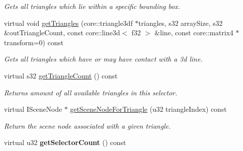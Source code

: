 \begin{DoxyCompactItemize}
\begin{DoxyCompactList}\small\item\em Gets all triangles which lie within a specific bounding box. \end{DoxyCompactList}\item 
\hypertarget{classirr_1_1scene_1_1_c_terrain_triangle_selector_ab5a72897c8f1dc5cc2e7c6ace368c8ed}{virtual void \hyperlink{classirr_1_1scene_1_1_c_terrain_triangle_selector_ab5a72897c8f1dc5cc2e7c6ace368c8ed}{get\-Triangles} (core\-::triangle3df $\ast$triangles, s32 array\-Size, s32 \&out\-Triangle\-Count, const core\-::line3d$<$ f32 $>$ \&line, const core\-::matrix4 $\ast$transform=0) const }\label{classirr_1_1scene_1_1_c_terrain_triangle_selector_ab5a72897c8f1dc5cc2e7c6ace368c8ed}

\begin{DoxyCompactList}\small\item\em Gets all triangles which have or may have contact with a 3d line. \end{DoxyCompactList}\item 
\hypertarget{classirr_1_1scene_1_1_c_terrain_triangle_selector_a52a73928eb235d1a88544dfa83f91760}{virtual s32 \hyperlink{classirr_1_1scene_1_1_c_terrain_triangle_selector_a52a73928eb235d1a88544dfa83f91760}{get\-Triangle\-Count} () const }\label{classirr_1_1scene_1_1_c_terrain_triangle_selector_a52a73928eb235d1a88544dfa83f91760}

\begin{DoxyCompactList}\small\item\em Returns amount of all available triangles in this selector. \end{DoxyCompactList}\item 
\hypertarget{classirr_1_1scene_1_1_c_terrain_triangle_selector_aa5816025aa110345f9e0c6edacfeb332}{virtual I\-Scene\-Node $\ast$ \hyperlink{classirr_1_1scene_1_1_c_terrain_triangle_selector_aa5816025aa110345f9e0c6edacfeb332}{get\-Scene\-Node\-For\-Triangle} (u32 triangle\-Index) const }\label{classirr_1_1scene_1_1_c_terrain_triangle_selector_aa5816025aa110345f9e0c6edacfeb332}

\begin{DoxyCompactList}\small\item\em Return the scene node associated with a given triangle. \end{DoxyCompactList}\item 
\hypertarget{classirr_1_1scene_1_1_c_terrain_triangle_selector_a0b12d9d72da339711db9402f5c94be64}{virtual u32 {\bfseries get\-Selector\-Count} () const }\label{classirr_1_1scene_1_1_c_terrain_triangle_selector_a0b12d9d72da339711db9402f5c94be64}


\end{DoxyCompactItemize}
